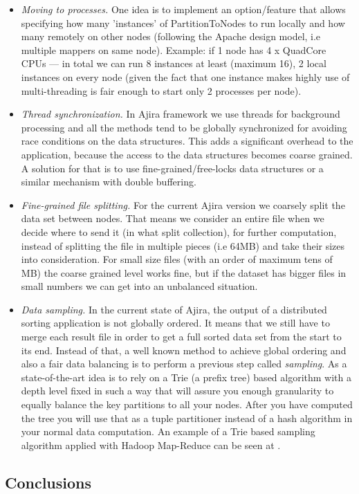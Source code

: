 \begin{itemize}
	\item \textit{Moving to processes.} One idea is to implement an option/feature that allows specifying how many 'instances' of PartitionToNodes to run locally and how many remotely on other nodes (following the Apache design model, i.e multiple mappers on same node). Example: if 1 node has 4 x QuadCore CPUs --- in total we can run 8 instances at least (maximum 16), 2 local instances on every node (given the fact that one instance makes highly use of multi-threading is fair enough to start only 2 processes per node).
	\item \textit{Thread synchronization.} In Ajira framework we use threads for background processing and all the methods tend to be globally synchronized for avoiding race conditions on the data structures. This adds a significant overhead to the application, because the access to the data structures becomes coarse grained. A solution for that is to use fine-grained/free-locks data structures or a similar mechanism with double buffering. 
	\item \textit{Fine-grained file splitting.} For the current Ajira version we coarsely split the data set between nodes. That means we consider an entire file when we decide where to send it (in what split collection), for further computation, instead of splitting the file in multiple pieces (i.e 64MB) and take their sizes into consideration. For small size files (with an order of maximum tens of MB) the coarse grained level works fine, but if the dataset has bigger files in small numbers we can get into an unbalanced situation.
	\item \textit{Data sampling.} In the current state of Ajira, the output of a distributed sorting application is not globally ordered. It means that we still have to merge each result file in order to get a full sorted data set from the start to its end. Instead of that, a well known method to achieve global ordering and also a fair data balancing is to perform a previous step called \textit{sampling}. As a state-of-the-art idea is to rely on a Trie (a prefix tree) based algorithm with a depth level fixed in such a way that will assure you enough granularity to equally balance the key partitions to all your nodes. After you have computed the tree you will use that as a tuple partitioner instead of a hash algorithm in your normal data computation. An example of a Trie based sampling algorithm applied with Hadoop Map-Reduce can be seen at \cite{terasort}.
\end{itemize}

\subsection{Conclusions}

